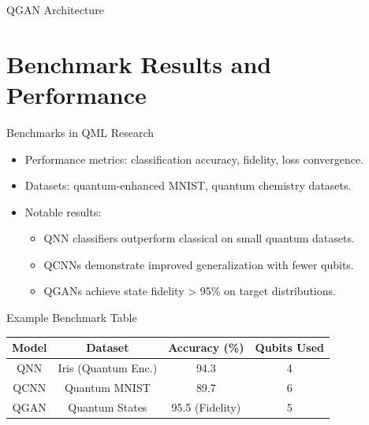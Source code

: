 \documentclass{beamer}
\begin{document}
\begin{frame}{QGAN Architecture}
\begin{center}
\end{center}
\end{frame}

\section{Benchmark Results and Performance}
\begin{frame}{Benchmarks in QML Research}
  \begin{itemize}
    \item Performance metrics: classification accuracy, fidelity, loss convergence.
    \item Datasets: quantum-enhanced MNIST, quantum chemistry datasets.
    \item Notable results:
    \begin{itemize}
      \item QNN classifiers outperform classical on small quantum datasets.
      \item QCNNs demonstrate improved generalization with fewer qubits.
      \item QGANs achieve state fidelity > 95\% on target distributions.
    \end{itemize}
  \end{itemize}
\end{frame}

\begin{frame}{Example Benchmark Table}
\begin{center}
\begin{tabular}{|c|c|c|c|}
\hline
Model & Dataset & Accuracy (\%) & Qubits Used \\
\hline
QNN & Iris (Quantum Enc.) & 94.3 & 4 \\
QCNN & Quantum MNIST & 89.7 & 6 \\
QGAN & Quantum States & 95.5 (Fidelity) & 5 \\
\hline
\end{tabular}
\end{center}
\end{frame}
\end{document}
